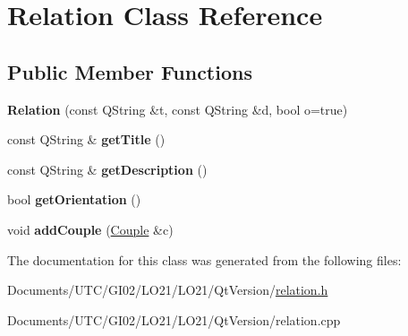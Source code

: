 \hypertarget{class_relation}{}\section{Relation Class Reference}
\label{class_relation}
\subsection*{Public Member Functions}
\begin{DoxyCompactItemize}
\item 
\mbox{\label{class_relation_ac80a2dddfc48008d40d5c0f5912c91fb}} 
{\bfseries Relation} (const Q\+String \&t, const Q\+String \&d, bool o=true)
\item 
\mbox{\label{class_relation_a8f8e09eebfd18260cf861666bbc158d5}} 
const Q\+String \& {\bfseries get\+Title} ()
\item 
\mbox{\label{class_relation_ab7e57505e988b1edfde861f1b5d932b2}} 
const Q\+String \& {\bfseries get\+Description} ()
\item 
\mbox{\label{class_relation_a6dc8d1bb7a79f02b37e338146bc4048f}} 
bool {\bfseries get\+Orientation} ()
\item 
\mbox{\label{class_relation_a6a42a4c0195c6dd8b3c9091a968b2396}} 
void {\bfseries add\+Couple} (\hyperlink{class_couple}{Couple} \&c)
\end{DoxyCompactItemize}


The documentation for this class was generated from the following files\+:\begin{DoxyCompactItemize}
\item 
Documents/\+U\+T\+C/\+G\+I02/\+L\+O21/\+L\+O21/\+Qt\+Version/\hyperlink{relation_8h}{relation.\+h}\item 
Documents/\+U\+T\+C/\+G\+I02/\+L\+O21/\+L\+O21/\+Qt\+Version/relation.\+cpp\end{DoxyCompactItemize}
